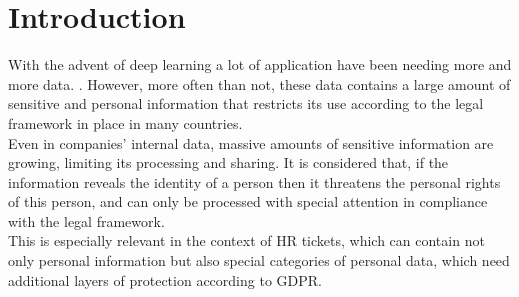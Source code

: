 \chapter{Introduction}
\label{sec:Introduction}


With the advent of deep learning a lot of application have been needing more and more data. . However, more often than not, these data contains a large amount of sensitive and personal information that restricts its use according to the legal framework in place in many countries. \\
Even in companies’ internal data, massive amounts of sensitive information are growing, limiting its processing and sharing. It is considered that, if the information reveals the identity of a person then it threatens the personal rights of this person, and can only be processed with special attention in compliance with the legal framework. \\
This is especially relevant in the context of HR tickets, which can contain not only personal information but also special categories of personal data, which need additional layers of protection according to GDPR. \\


